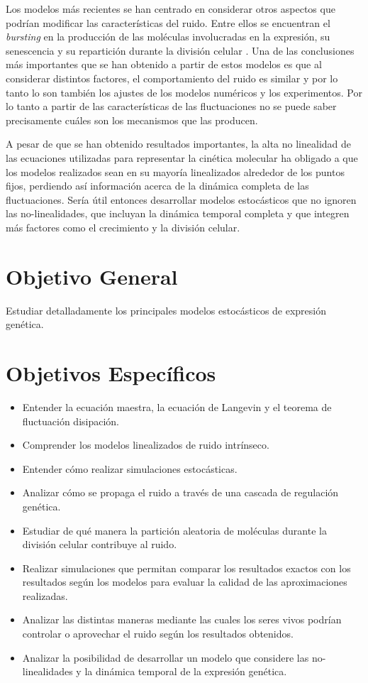 \documentclass[12pt]{article}
\begin{document}
Los modelos m\'as recientes se han centrado en considerar otros aspectos que podr\'ian modificar las caracter\'isticas del ruido. Entre ellos se encuentran el \textit{bursting} en la producci\'on de las mol\'eculas involucradas en la expresi\'on, su senescencia \cite{pedraza08} y su repartici\'on durante la divisi\'on celular \cite{huh11a} \cite{huh11b}. Una de las conclusiones m\'as importantes que se han obtenido a partir de estos modelos es que al considerar distintos factores, el comportamiento del ruido es similar y por lo tanto lo son tambi\'en los ajustes de los modelos num\'ericos y los experimentos. Por lo tanto a partir de las caracter\'isticas de las fluctuaciones no se puede saber precisamente cu\'ales son los mecanismos que las producen.

A pesar de que se han obtenido resultados importantes, la alta no linealidad de las ecuaciones utilizadas para representar la cin\'etica molecular ha obligado a que los modelos realizados sean en su mayor\'ia linealizados alrededor de los puntos fijos, perdiendo as\'i informaci\'on acerca de la din\'amica completa de las fluctuaciones. Ser\'ia \'util entonces desarrollar modelos estoc\'asticos que no ignoren las no-linealidades, que incluyan la din\'amica temporal completa y que integren m\'as factores como el crecimiento y la divisi\'on celular.


\section{Objetivo General}

Estudiar detalladamente los principales modelos estoc\'asticos de expresi\'on gen\'etica.

\section{Objetivos Espec\'ificos}
\begin{itemize}
        \item Entender la ecuaci\'on maestra, la ecuaci\'on de Langevin y el teorema de fluctuaci\'on disipaci\'on.
	\item Comprender los modelos linealizados de ruido intr\'inseco.
        \item Entender c\'omo realizar simulaciones estoc\'asticas.
	\item Analizar c\'omo se propaga el ruido a trav\'es de una cascada de regulaci\'on gen\'etica.
	\item Estudiar de qu\'e manera la partici\'on aleatoria de mol\'eculas durante la divisi\'on celular contribuye al ruido.
	\item Realizar simulaciones que permitan comparar los resultados exactos con los resultados seg\'un los modelos para evaluar la calidad de las aproximaciones realizadas.
        \item Analizar las distintas maneras mediante las cuales los seres vivos podr\'ian controlar o aprovechar el ruido seg\'un los resultados obtenidos.
        \item Analizar la posibilidad de desarrollar un modelo que considere las no-linealidades y la din\'amica temporal de la expresi\'on gen\'etica.
\end{itemize}
\end{document}
